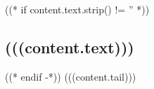 ((* if content.text.strip() != '' *))
\subsection{(((content.text)))}
((* endif -*)) (((content.tail)))

